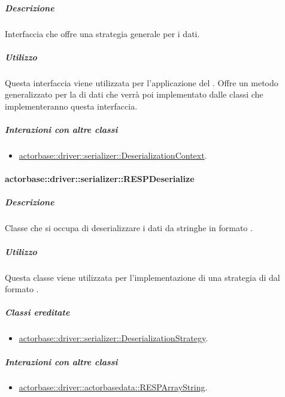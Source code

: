\documentclass{scalatekids-article}
\begin{document}
\subparagraph{Descrizione}

Interfaccia che offre una strategia generale per  i dati.

\subparagraph{Utilizzo}

Questa interfaccia viene utilizzata per l'applicazione del 
. Offre un metodo generalizzato per la
 di dati che verrà poi implementato dalle classi che
implementeranno questa interfaccia.

\subparagraph{Interazioni con altre classi}

\begin{itemize}

\item \hyperref[sec:actorbase::driver::serializer::DeserializationContext]{actorbase::driver::serializer::DeserializationContext}.

\end{itemize}

\paragraph{actorbase::driver::serializer::RESPDeserialize}

\subparagraph{Descrizione}

Classe che si occupa di deserializzare i dati da stringhe in formato .

\subparagraph{Utilizzo}

Questa classe viene utilizzata per l'implementazione di una strategia di
 dal formato .

\subparagraph{Classi ereditate}

\begin{itemize}

\item \hyperref[sec:actorbase::driver::serializer::DeserializationStrategy]{actorbase::driver::serializer::DeserializationStrategy}.

\end{itemize}

\subparagraph{Interazioni con altre classi}

\begin{itemize}

\item \hyperref[sec:actorbase::driver::actorbasedata::RESPArrayString]{actorbase::driver::actorbasedata::RESPArrayString}.

\end{itemize}
\end{document}
